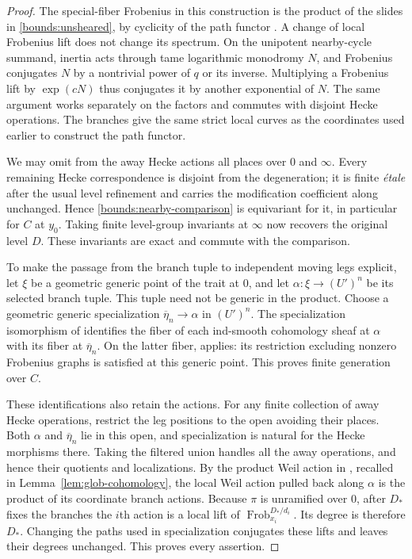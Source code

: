 \documentclass[11pt]{article}
\numberwithin{equation}{section}
\theoremstyle{definition}
\theoremstyle{remark}
\newcommand{\Frob}{\operatorname{Frob}}
\begin{document}
\begin{proof}
The special-fiber Frobenius in this construction is the product of
the slides in \eqref{bounds:unsheared}, by cyclicity of the path functor
\cite[Proposition~2.5, Coherent path rotation]{Parent}.  A change of
local Frobenius lift does not change its spectrum.  On the unipotent
nearby-cycle summand, inertia acts through tame logarithmic monodromy
$N$, and Frobenius conjugates $N$ by a nontrivial power of $q$ or its
inverse.  Multiplying a Frobenius lift by $\exp(cN)$ thus conjugates it
by another exponential of $N$.  The same argument works separately
on the factors and commutes with disjoint Hecke operations.  The
branches give the same strict local curves as the coordinates used
earlier to construct the path functor.

We may omit from the away Hecke actions all places over $0$ and
$\infty$.  Every remaining Hecke correspondence is disjoint from the
degeneration; it is finite \emph{\'etale} after the usual level
refinement and carries the modification coefficient along unchanged.
Hence \eqref{bounds:nearby-comparison} is equivariant for it, in
particular for $C$ at $y_0$.  Taking finite level-group invariants at
$\infty$ now recovers the original level $D$.  These invariants are
exact and commute with the comparison.

To make the passage from the branch tuple to independent moving legs
explicit, let $\xi$ be a geometric generic point of the trait at $0$,
and let $\alpha:\xi\to(U')^n$ be its selected branch tuple.  This
tuple need not be generic in the product.  Choose a geometric generic
specialization $\overline\eta_n\to\alpha$ in $(U')^n$.
The specialization isomorphism of
\cite[Theorem~4.2.3]{Bounds:XueSmoothness} identifies the fiber of
each ind-smooth cohomology sheaf at $\alpha$ with its fiber at
$\overline\eta_n$.  On the latter fiber,
\cite[Theorem~2]{Bounds:XueFiniteness} applies: its restriction
excluding nonzero Frobenius graphs is satisfied at this generic
point.  This proves finite generation over $C$.

These identifications also retain the actions.  For any finite
collection of away Hecke operations, restrict the leg positions to
the open avoiding their places.  Both $\alpha$ and
$\overline\eta_n$ lie in this open, and specialization is natural
for the Hecke morphisms there.  Taking the filtered union handles all
the away operations, and hence their quotients and localizations.
By the product Weil action in
\cite[Proposition~5.0.4]{Bounds:XueSmoothness}, recalled in
Lemma~\ref{lem:glob-cohomology}, the local Weil action pulled back
along $\alpha$ is the product of its coordinate branch actions.
Because $\pi$ is unramified over $0$, after $D_*$ fixes the branches
the $i$th action is a local lift of
$\Frob_{x_i}^{D_*/d_i}$.  Its degree is therefore $D_*$.
Changing the paths used in specialization conjugates these lifts
and leaves their degrees unchanged.  This proves every assertion.
\end{proof}
\end{document}
